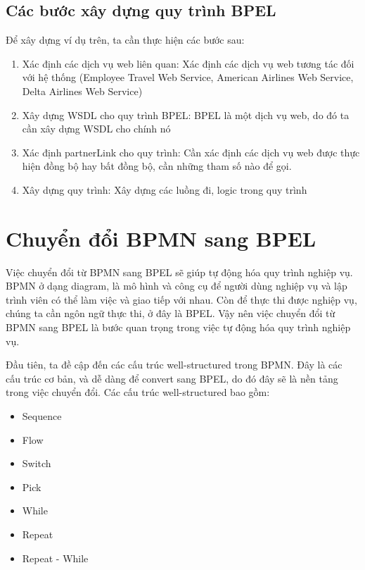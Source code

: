 \subsection{Các bước xây dựng quy trình BPEL}
Để xây dựng ví dụ trên, ta cần thực hiện các bước sau:
\begin{enumerate}
    \item Xác định các dịch vụ web liên quan: Xác định các dịch vụ web tương tác đối với hệ thống (Employee Travel Web Service, American Airlines Web Service, Delta Airlines Web Service)
    \item Xây dựng WSDL cho quy trình BPEL: BPEL là một dịch vụ web, do đó ta cần xây dựng WSDL cho chính nó
    \item Xác định partnerLink cho quy trình: Cần xác định các dịch vụ web được thực hiện đồng bộ hay bất đồng bộ, cần những tham số nào để gọi.
    \item Xây dựng quy trình: Xây dựng các luồng đi, logic trong quy trình
\end{enumerate}



\section{Chuyển đổi BPMN sang BPEL}
\hspace*{0.5cm} \par Việc chuyển đổi từ BPMN sang BPEL sẽ giúp tự động hóa quy trình nghiệp vụ. BPMN ở dạng diagram, là mô hình và công cụ để người dùng nghiệp vụ và lập trình viên có thể làm việc và giao tiếp với nhau.
Còn để thực thi được nghiệp vụ, chúng ta cần ngôn ngữ thực thi, ở đây là BPEL. Vậy nên việc chuyển đổi từ BPMN sang BPEL là bước quan trọng trong việc tự động hóa quy trình nghiệp vụ.

\par Đầu tiên, ta đề cập đến các cấu trúc well-structured trong BPMN. Đây là các cấu trúc cơ bản, và dễ dàng để convert sang BPEL, do đó đây sẽ là nền tảng trong việc chuyển đổi. Các cấu trúc well-structured bao gồm:
\begin{itemize}
    \item Sequence
    \item Flow
    \item Switch
    \item Pick
    \item While
    \item Repeat
    \item Repeat - While
\end{itemize}

